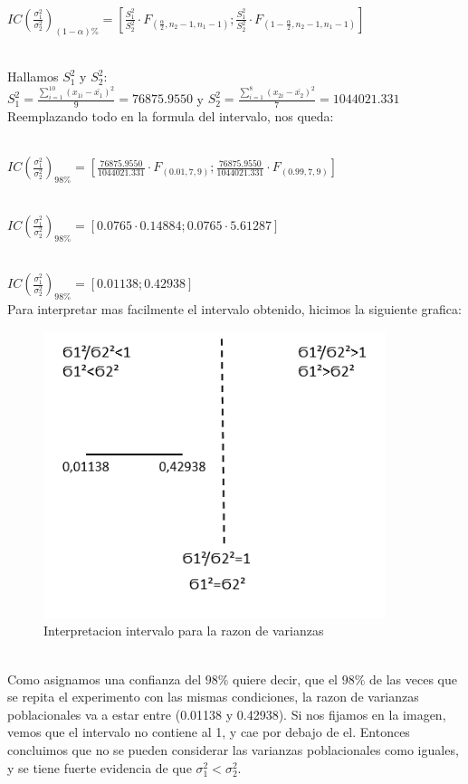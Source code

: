 \documentclass[letterpaper,12pt,onecolumn,titlepage]{article}
\begin{document}
~\\ $IC(\frac{\sigma_1^{2}}{\sigma_2^{2}})_{(1-\alpha)\%}=\left[\frac{S_{1} ^{2}}{S_{2} ^{2}}\cdot F_{(\frac{\alpha}{2},n_{2}-1,n_{1}-1)}  ; \frac{S_{1} ^{2}}{S_{2} ^{2}}\cdot F_{(1-\frac{\alpha}{2},n_{2}-1,n_{1}-1)} \right]$

~\\ Hallamos $S_{1}^2$ y $S_{2}^2$:
~\\ $S_{1}^2=\frac{\sum\limits_{i=1}^{10}(x_{1i}-\bar{x_1})^2}{9}=76875.9550$ y $S_{2}^2=\frac{\sum\limits_{i=1}^{8}(x_{2i}-\bar{x_2})^2}{7}=1044021.331$
~\\ Reemplazando todo en la formula del intervalo, nos queda:

~\\ $IC(\frac{\sigma_1^{2}}{\sigma_2^{2}})_{98\%}=\left[\frac{76875.9550}{1044021.331}\cdot F_{(0.01,7,9)}  ; \frac{76875.9550}{1044021.331}\cdot F_{(0.99,7,9)} \right]$

~\\ $IC(\frac{\sigma_1^{2}}{\sigma_2^{2}})_{98\%}=[0.0765\cdot0.14884  ;  0.0765\cdot5.61287]$

~\\ $IC(\frac{\sigma_1^{2}}{\sigma_2^{2}})_{98\%}=[0.01138 ; 0.42938]$
~\\ Para interpretar mas facilmente el intervalo obtenido, hicimos la siguiente grafica:
\begin{figure}[!h]
    \begin{center}
        \includegraphics[width=10cm]{Figuras/Grafico4.png}
        \caption{Interpretacion intervalo para la razon de varianzas}
        \label{fig:Densidad}
    \end{center}
\end{figure}
~\\ Como asignamos una confianza del $98\%$ quiere decir, que el $98\%$ de las veces que se repita el experimento con las mismas condiciones, la razon de varianzas poblacionales va a estar entre (0.01138 y 0.42938). Si nos fijamos en la imagen, vemos que el intervalo no contiene al 1, y cae por debajo de el. Entonces concluimos que no se pueden considerar las varianzas poblacionales como iguales, y se tiene fuerte evidencia de que $\sigma_{1}^2<\sigma_{2}^2$.
\end{document}
